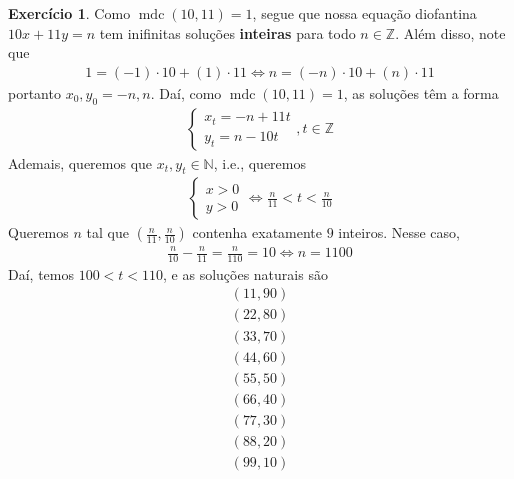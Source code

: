 \documentclass[a4paper,12pt]{article}
\DeclareMathOperator{\mdc}{mdc}
\theoremstyle{definition}
\newtheorem{exercise}{Exercício}%
\begin{document}
	\begin{exercise}
		Como $\mdc(10,11) = 1$, segue que nossa equação diofantina $10x + 11y = n$ tem inifinitas soluções \textbf{inteiras} para todo $n\in\mathbb{Z}$. Além disso, note que
		\begin{align*}
		1 = (-1)\cdot 10 + (1)\cdot 11 \Leftrightarrow n = (-n)\cdot 10 + (n)\cdot 11
		\end{align*}
		portanto $x_0, y_0 = -n, n$. Daí, como $\mdc(10,11) = 1$, as soluções têm a forma
		\begin{align*}
		\begin{cases}
		x_t = -n + 11t \\
		y_t = n - 10t
		\end{cases}, t\in\mathbb{Z}
		\end{align*}
		Ademais, queremos que $x_t, y_t\in\mathbb{N}$, i.e., queremos
		\begin{align*}
		\begin{cases}
		x > 0 \\
		y > 0 
		\end{cases} \Leftrightarrow \frac{n}{11} < t < \frac{n}{10}
		\end{align*} 
		Queremos $n$ tal que $\displaystyle{ \left( \frac{n}{11}, \frac{n}{10} \right) }$ contenha exatamente $9$ inteiros. Nesse caso,
		\begin{align*}
		\frac{n}{10} - \frac{n}{11} = \frac{n}{110} = 10 \Leftrightarrow n = 1100
		\end{align*}
		Daí, temos $100 < t < 110$, e as soluções naturais são
		\begin{align*}
		(11, 90) \\
		(22, 80) \\
		(33, 70) \\
		(44, 60) \\
		(55, 50) \\
		(66, 40) \\
		(77, 30) \\
		(88, 20) \\
		(99, 10) \\
		\end{align*}
	\end{exercise}
	
	
	
	
\end{document}
